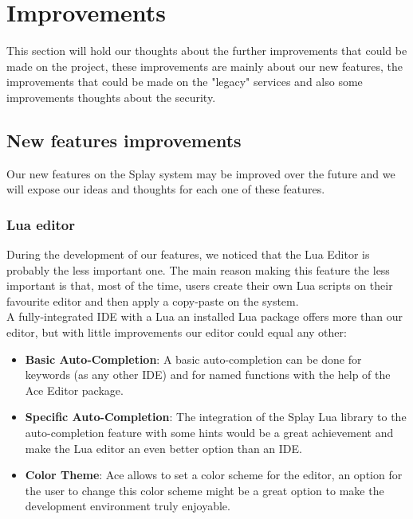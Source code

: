 \documentclass{eplmastersthesis}
\begin{document}
    \section{Improvements}

      This section will hold our thoughts about the further improvements
      that could be made on the project, these improvements are mainly about
      our new features, the improvements that could be made on the "legacy"
      services and also some improvements thoughts about the security.

      \subsection{New features improvements}

        Our new features on the Splay system may be improved over the future
        and we will expose our ideas and thoughts for each one of these
        features.

        \subsubsection{Lua editor}

        During the development of our features, we noticed that the Lua Editor
        is probably the less important one. The main reason making this feature
        the less important is that, most of the time, users create their own Lua
        scripts on their favourite editor and then apply a copy-paste on the
        system.\\
        A fully-integrated IDE with a Lua an installed Lua package offers more
        than our editor, but with little improvements our editor could equal
        any other:

        \begin{itemize}
          \item \textbf{Basic Auto-Completion}: A basic auto-completion can be
          done for keywords (as any other IDE) and for named functions with
          the help of the Ace Editor package.
          \item \textbf{Specific Auto-Completion}: The integration of the Splay
          Lua library to the auto-completion feature with some hints would
          be a great achievement and make the Lua editor an even better
          option than an IDE.
          \item \textbf{Color Theme}: Ace allows to set a color scheme for
          the editor, an option for the user to change this color scheme
          might be a great option to make the development environment
          truly enjoyable.
        \end{itemize}
\end{document}
